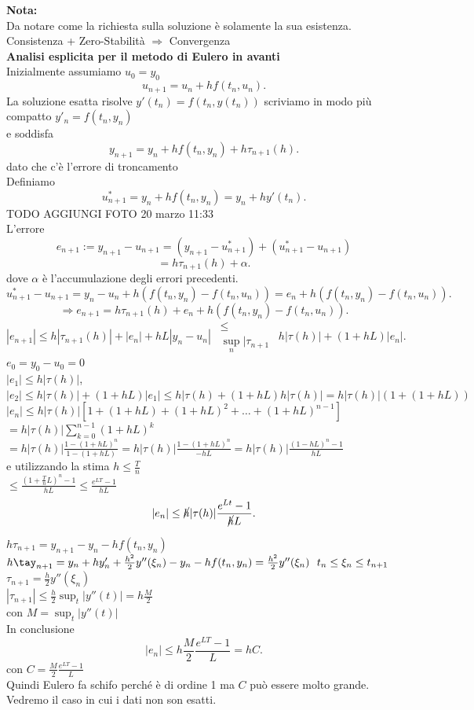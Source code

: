 \documentclass[12px]{article}
\begin{document}
\textbf{Nota:}\\
Da notare come la richiesta sulla soluzione è solamente la sua esistenza.\\
Consistenza + Zero-Stabilità $ \Rightarrow $ Convergenza\\
\textbf{Analisi esplicita per il metodo di Eulero in avanti}\\
Inizialmente assumiamo $u_0 = y_0$\\
\[
	u_{n+1} = u_n + hf(t_n,u_n)
.\] 
La soluzione esatta risolve $y'(t_n) = f(t_n,y(t_n))$ scriviamo in modo più compatto  $y'_n = f(t_n,y_n)$\\
e  soddisfa
\[
	y_{n+1} = y_n  + hf(t_n,y_n) + h\tau_{n+1}(h)
.\] 
dato che c'è l'errore di troncamento\\
Definiamo 
\[
	u_{n+1}^* = y_n + hf(t_n,y_n) = y_n + h y'(t_n)
.\] 
TODO AGGIUNGI FOTO 20 marzo 11:33\\
L'errore 
 \[
	 e_{n+1} := y_{n+1} - u_{n+1} = (y_{n+1}-u_{n+1}^*) + (u_{n+1}^*- u_{n+1})
\] \[
= h\tau_{n+1}(h) + \alpha
.\] 
dove $\alpha$ è l'accumulazione degli errori precedenti.
\[
	u_{n+1}^*-u_{n+1}= y_n-u_n + h(f(t_n,y_n) - f(t_n,u_n)) = e_n + h(f(t_n,y_n) - f(t_n,u_n))
.\] 
\[
	\Rightarrow  e_{n+1} = h\tau_{n+1}(h) + e_n + h(f(t_n,y_n) - f(t_n,u_n))
.\] 
\[
	|e_{n+1}|\leq h | \tau_{n+1}(h)| + |e_n| + hL |y_n - u_n|\ \ \substack{\leq\\ \sup_n|\tau_{n+1}} \ \ h|\tau(h) | + (1 + hL)|e_n|
.\] 
$e_0 = y_0 - u_0= 0$\\
$|e_1|\leq h|\tau(h)|$, $|e_2|\leq h|\tau(h)| + (1 + hL)|e_1|\leq h|\tau(h) + (1+hL)h|\tau(h)| = h|\tau(h)|(1 + (1 + hL))$\\
$|e_n|\leq h|\tau(h)|[1 + (1 + hL) + (1 + hL)^2 + \ldots + (1 + hL)^{n-1}]$ 
 $\displaystyle = h |\tau(h)|\sum^{n-1}_{k=0}(1+hL)^k$\\
 $ \displaystyle = h|\tau(h)|\frac{1 - (1 + hL)^n}{1 - (1+hL)}= h|\tau(h)|\frac{1 - (1 + hL)^n}{-hL} =h|\tau(h)| \frac{(1 - hL)^n - 1}{hL}$\\
 e utilizzando la stima  $h\leq \frac Tn $\\
 $\displaystyle \leq \frac{(1 + \frac T n L )^n-1}{hL} \leq \frac{e^{LT}-1}{hL}$\\
 \[|e_n|\leq \cancel{h}|\tau(h)|\frac{e^{Lt}-1}{\cancel{h}L}.\]

 $h\tau_{n+1} = y_{n+1} - y_n - hf(t_n,y_n)$\\
 $h\tay_{n+1} = y_n + h y_n' + \frac {h^2}2 y''(\xi_n)- y_n-h f(t_n,y_n) = \frac {h^2}2 y''(\xi_n) \ \ t_n\leq\xi_n\leq t_{n+1}$\\
 $\tau_{n+1} = \frac h 2 y''(\xi_n)$\\
 $\displaystyle|\tau_{n+1}|\leq \frac h 2 \sup_{t}|y''(t)| = h \frac M 2$ \\
 con $M = \sup_t|y''(t)|$\\
 In conclusione
  \[
	  |e_n|\leq h\frac M 2 \frac{e^{LT} - 1}L = h C
 .\] 
 con $C = \frac M 2 \frac{e^{LT} - 1}L$ \\
 Quindi Eulero fa schifo perché è di ordine 1 ma $C$ può essere molto grande.\\
 Vedremo il caso in cui i dati non son esatti.
\end{document}
